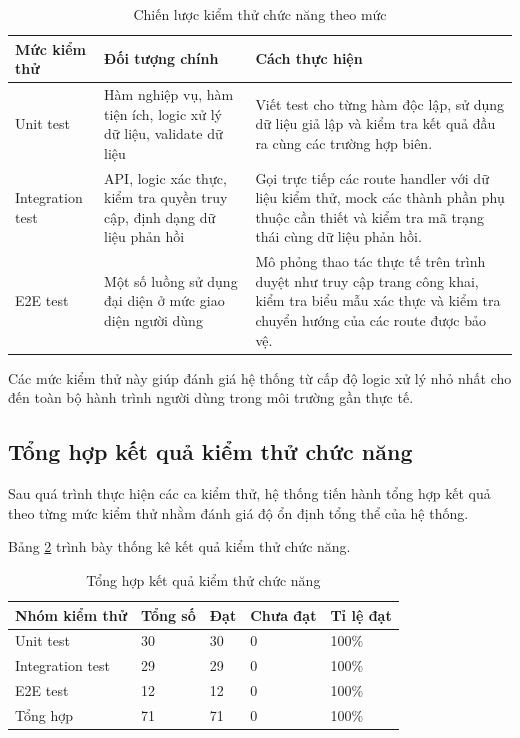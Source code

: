 \begin{table}[H]
\centering
\caption{Chiến lược kiểm thử chức năng theo mức}
\label{tab:functional-test-levels}
\small
\begin{tabular}{|p{2.8cm}|p{4.7cm}|p{5.3cm}|}
\hline
\textbf{Mức kiểm thử} & \textbf{Đối tượng chính} & \textbf{Cách thực hiện} \\ \hline

Unit test & Hàm nghiệp vụ, hàm tiện ích, logic xử lý dữ liệu, validate dữ liệu & Viết test cho từng hàm độc lập, sử dụng dữ liệu giả lập và kiểm tra kết quả đầu ra cùng các trường hợp biên. \\ \hline

Integration test & API, logic xác thực, kiểm tra quyền truy cập, định dạng dữ liệu phản hồi & Gọi trực tiếp các route handler với dữ liệu kiểm thử, mock các thành phần phụ thuộc cần thiết và kiểm tra mã trạng thái cùng dữ liệu phản hồi. \\ \hline

E2E test & Một số luồng sử dụng đại diện ở mức giao diện người dùng & Mô phỏng thao tác thực tế trên trình duyệt như truy cập trang công khai, kiểm tra biểu mẫu xác thực và kiểm tra chuyển hướng của các route được bảo vệ. \\ \hline
\end{tabular}
\end{table}

Các mức kiểm thử này giúp đánh giá hệ thống từ cấp độ logic xử lý nhỏ nhất cho đến toàn bộ hành trình người dùng trong môi trường gần thực tế.

\subsection{Tổng hợp kết quả kiểm thử chức năng}

Sau quá trình thực hiện các ca kiểm thử, hệ thống tiến hành tổng hợp kết quả theo từng mức kiểm thử nhằm đánh giá độ ổn định tổng thể của hệ thống.

Bảng \ref{tab:functional-summary} trình bày thống kê kết quả kiểm thử chức năng.

\begin{table}[H]
\centering
\caption{Tổng hợp kết quả kiểm thử chức năng}
\label{tab:functional-summary}
\small
\begin{tabular}{|p{3.0cm}|p{2.3cm}|p{2.3cm}|p{2.3cm}|p{2.3cm}|}
\hline
\textbf{Nhóm kiểm thử} & \textbf{Tổng số} & \textbf{Đạt} & \textbf{Chưa đạt} & \textbf{Tỉ lệ đạt} \\ \hline

Unit test & 30 & 30 & 0 & 100\% \\ \hline

Integration test & 29 & 29 & 0 & 100\% \\ \hline

E2E test & 12 & 12 & 0 & 100\% \\ \hline

Tổng hợp & 71 & 71 & 0 & 100\% \\ \hline
\end{tabular}
\end{table}

